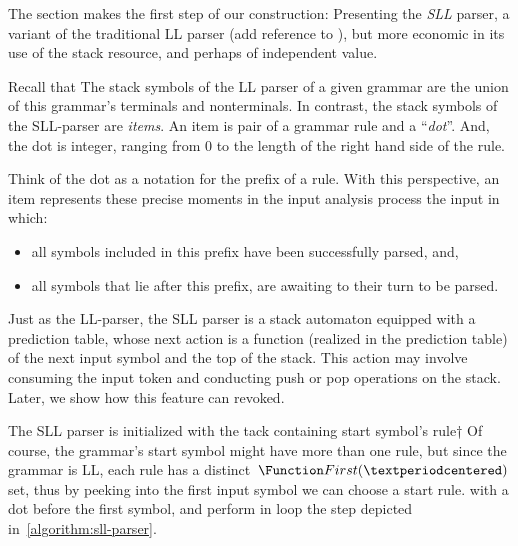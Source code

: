 The section makes the first step of our construction: Presenting the \emph{SLL}
parser, a variant of the traditional LL parser (add reference to
\figuessoandso), but more economic in its use of the stack resource, and
perhaps of independent value.

Recall that The stack symbols of the LL parser of a given grammar are the union
of this grammar's terminals and nonterminals. In contrast, the stack symbols of
the SLL-parser are \emph{items}. An item is pair of a grammar rule and a
``\emph{dot}''. And, the dot is integer, ranging from 0 to the length of the
right hand side of the rule. 

Think of the dot as a notation for the prefix of a rule. With this perspective,
an item represents these precise moments in the input analysis process the
input in which: 
\begin{itemize}
  \item all symbols included in this prefix have been successfully parsed, and,
  \item all symbols that lie after this prefix, are awaiting to their turn
      to be parsed.
\end{itemize}

Just as the LL-parser, the SLL parser is a stack automaton equipped with a
prediction table, whose next action is a function (realized in the prediction
table) of the next input symbol and the top of the stack. This action may
involve consuming the input token and conducting push or pop operations on the
stack. Later, we show how this feature \whichexactly can revoked.

The SLL parser is initialized with the  tack containing start symbol's rule†{
  \ididnotquitegetthis
  Of course, the grammar's start symbol might have more than one rule,
  but since the grammar is LL, each rule has a
  distinct~$\Function First(·)$ set, thus by peeking into the
first input symbol we can choose a start rule.}
with a dot before the first symbol, and perform in loop the
step depicted
in~\cref{algorithm:sll-parser}.

